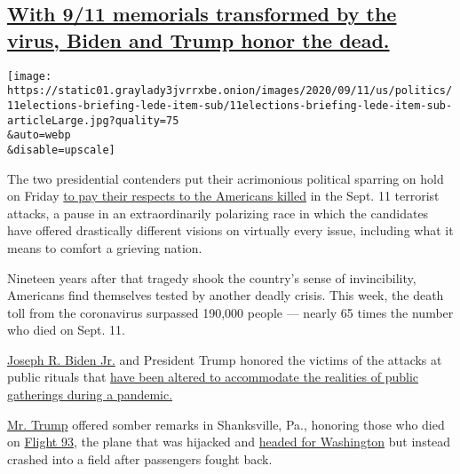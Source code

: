 \hypertarget{with-911-memorials-transformed-by-the-virus-biden-and-trump-honor-the-dead}{%
\subsection{\texorpdfstring{\protect\hyperlink{with-9-11-memorials-transformed-by-the-virus-biden-and-trump-honor-the-dead}{With
9/11 memorials transformed by the virus, Biden and Trump honor the
dead.}}{With 9/11 memorials transformed by the virus, Biden and Trump honor the dead.}}\label{with-911-memorials-transformed-by-the-virus-biden-and-trump-honor-the-dead}}

\texttt{[image: https://static01.graylady3jvrrxbe.onion/images/2020/09/11/us/politics/11elections-briefing-lede-item-sub/11elections-briefing-lede-item-sub-articleLarge.jpg?quality=75\\\&auto=webp\\\&disable=upscale]}

The two presidential contenders put their acrimonious political sparring
on hold on Friday
\href{https://www.nytimes3xbfgragh.onion/2020/09/11/us/politics/shanksville-trump-biden.html}{to
pay their respects to the Americans killed} in the Sept. 11 terrorist
attacks, a pause in an extraordinarily polarizing race in which the
candidates have offered drastically different visions on virtually every
issue, including what it means to comfort a grieving nation.

Nineteen years after that tragedy shook the country's sense of
invincibility, Americans find themselves tested by another deadly
crisis. This week, the death toll from the coronavirus surpassed 190,000
people --- nearly 65 times the number who died on Sept. 11.

\href{https://www.nytimes3xbfgragh.onion/interactive/2020/us/elections/joe-biden.html}{Joseph
R. Biden Jr.} and President Trump honored the victims of the attacks at
public rituals that
\href{https://www.nytimes3xbfgragh.onion/2020/09/11/nyregion/9-11-ceremony-September-11th.html}{have
been altered to accommodate the realities of public gatherings during a
pandemic.}

\href{https://www.nytimes3xbfgragh.onion/interactive/2020/us/elections/donald-trump.html}{Mr.
Trump} offered somber remarks in Shanksville, Pa., honoring those who
died on
\href{https://www.nytimes3xbfgragh.onion/2001/09/13/us/after-attacks-united-flight-93-doomed-flight-passengers-vowed-perish-fighting.html}{Flight
93}, the plane that was hijacked and
\href{https://www.nytimes3xbfgragh.onion/2004/07/22/politics/details-emerge-on-flight-93.html}{headed
for Washington} but instead crashed into a field after passengers fought
back.

